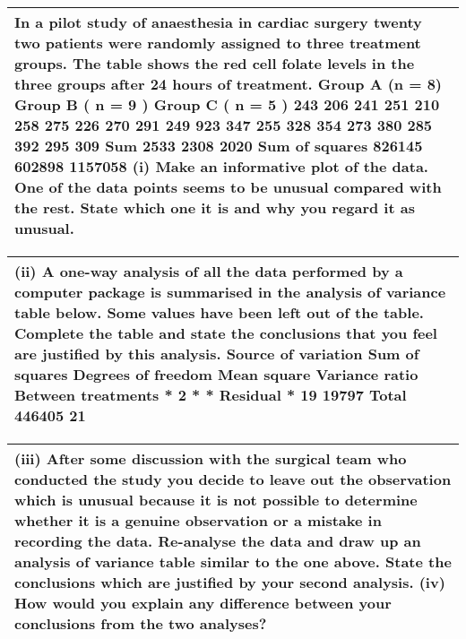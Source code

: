 \documentclass[a4paper,12pt]{article}
\begin{document}
\begin{table}[ht!]
 \centering
 \begin{tabular}{|p{15cm}|}
 \hline  
In a pilot study of anaesthesia in cardiac surgery twenty two patients were randomly assigned to three treatment groups. The table shows the red cell folate levels in the three groups after 24 hours of treatment.
Group A (n = 8)
Group B ( n = 9 )
Group C ( n = 5 ) 243 206 241 251 210 258 275 226 270 291 249 923 347 255 328 354 273 380 285 392 295 309 Sum 2533 2308 2020 Sum of squares 826145 602898 1157058
(i) Make an informative plot of the data. One of the data points seems to be unusual compared with the rest. State which one it is and why you regard it as unusual.


\\ \hline
  \end{tabular}
\end{table}

\begin{table}[ht!]
 \centering
 \begin{tabular}{|p{15cm}|}
 \hline  
(ii) A one-way analysis of all the data performed by a computer package is summarised in the analysis of variance table below. Some values have been left out of the table. Complete the table and state the conclusions that you feel are justified by this analysis.
Source of variation Sum of squares
Degrees of freedom
Mean square
Variance ratio Between treatments * 2 * * Residual * 19 19797 Total 446405 21\\ \hline
  \end{tabular}
\end{table}
\begin{table}[ht!]
 \centering
 \begin{tabular}{|p{15cm}|}
 \hline  
(iii) After some discussion with the surgical team who conducted the study you decide to leave out the observation which is unusual because it is not possible to determine whether it is a genuine observation or a mistake in recording the data. Re-analyse the data and draw up an analysis of variance table similar to the one above. State the conclusions which are justified by your second analysis.
(iv) How would you explain any difference between your conclusions from the two analyses?
\\ \hline
  \end{tabular}
\end{table}
\end{document}
